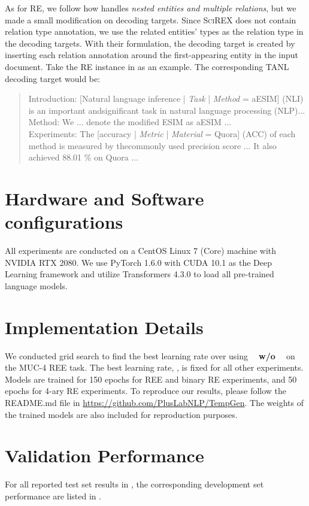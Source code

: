 \documentclass[11pt]{article}
\begin{document}
As for RE, we follow how \citet{paolini2021structured} handles \textit{nested entities and multiple relations}, but we made a small modification on decoding targets. Since \textsc{SciREX} does not contain relation type annotation, we use the related entities' types as the relation type in the decoding targets. With their formulation, the decoding target is created by inserting each relation annotation around the first-appearing entity in the input document. Take the RE instance in  as an example. The corresponding TANL decoding target would be:

\begin{quote}
    Introduction: [Natural language inference | \textit{Task} | \textit{Method} = aESIM] (NLI) is an important andsignificant task in natural language processing (NLP)... \\
    Method: We ... denote the modified ESIM as aESIM ...\\
    Experiments: The [accuracy | \textit{Metric} | \textit{Material} = Quora] (ACC) of each method is measured by thecommonly used precision score ... It also achieved 88.01 \% on Quora ...
\end{quote}




\section{Hardware and Software configurations}
All experiments are conducted on a CentOS Linux 7 (Core) machine with NVIDIA RTX 2080. We use PyTorch 1.6.0 with CUDA 10.1 as the Deep Learning framework and utilize Transformers 4.3.0 to load all pre-trained language models. 

\section{Implementation Details}
We conducted grid search to find the best learning rate over  using \textbf{\modelshort~ w/o \topkcopy~} on the MUC-4 REE task. The best learning rate, , is fixed for all other experiments. Models are trained for 150 epochs for REE and binary RE experiments, and 50 epochs for 4-ary RE experiments. To reproduce our results, please follow the README.md file in \url{https://github.com/PlusLabNLP/TempGen}. The weights of the trained models are also included for reproduction purposes.

\section{Validation Performance}
For all reported test set results in , the corresponding development set performance are listed in .

 
\end{document}
